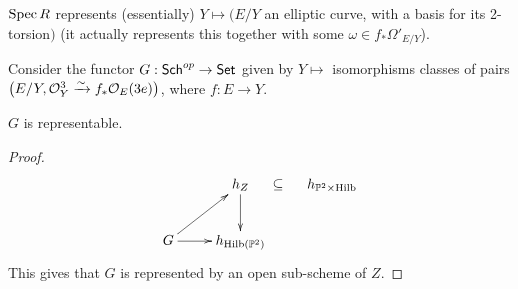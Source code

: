 $\operatorname{Spec} R$ represents (essentially) $Y\mapsto \bigl(E/Y$ an elliptic curve, with a basis
for its 2-torsion$\bigr)$ (it actually represents this together with some $\omega\in
f_*\Omega'_{E/Y}$).

Consider the functor $G:\text{\sf Sch}^{op}\to \text{\sf Set}$ given by $Y\mapsto $ isomorphisms classes of
pairs $\bigl(E/Y, \mathcal{O}_Y^3\xrightarrow{\sim} f_* \mathcal{O}_E(3e)\bigr)$, where $f:E\to Y$.
\begin{proposition}
  $G$ is representable.
\end{proposition}
\begin{proof}
  \[\xymatrix{
                   & h_Z \ar[d] \ar@{}[r]|- {\mbox{$\subseteq$}} & h_{\PP^2\times \hilb}\\
   G\ar[r] \ar[ur] & h_{\hilb  (\PP^2)} }\] This gives that $G$ is represented by an
  open sub-scheme of $Z$. 
\end{proof}
